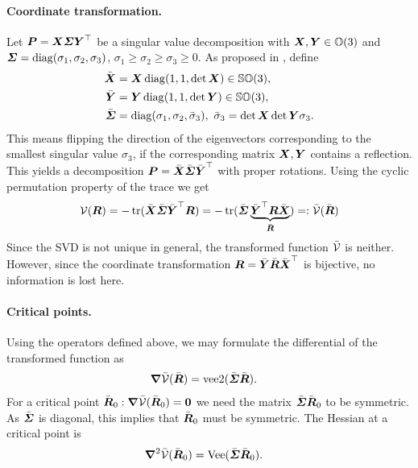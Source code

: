 \paragraph{Coordinate transformation.}
Let $\boldsymbol{P} = \boldsymbol{X} \boldsymbol{\varSigma} \boldsymbol{Y}^\top$ be a singular value decomposition with $\boldsymbol{X}, \boldsymbol{Y} \in \mathbb{O}(3)$ and $\boldsymbol{\varSigma} = \operatorname{diag}(\sigma_1, \sigma_2, \sigma_3)$, $\sigma_1 \geq \sigma_2 \geq \sigma_3 \geq 0$.
As proposed in \cite{Kabsch:SSVD}, define 
\begin{subequations}\label{eq:DefSSVD}
\begin{align}
 \bar{\boldsymbol{X}} &= \boldsymbol{X} \operatorname{diag}(1, 1, \det\boldsymbol{X}) \in \mathbb{SO}(3),
\\
 \bar{\boldsymbol{Y}} &= \boldsymbol{Y} \operatorname{diag}(1, 1, \det\boldsymbol{Y}) \in \mathbb{SO}(3),
\\
 \bar{\boldsymbol{\varSigma}} &= \operatorname{diag}(\sigma_1, \sigma_2, \bar{\sigma}_3), \ \bar{\sigma}_3 = \det\boldsymbol{X}\det\boldsymbol{Y} \sigma_3 .
\end{align} 
\end{subequations}
This means flipping the direction of the eigenvectors corresponding to the smallest singular value $\sigma_3$, if the corresponding matrix $\boldsymbol{X}, \boldsymbol{Y}$ contains a reflection.
This yields a decomposition $\boldsymbol{P} = \bar{\boldsymbol{X}} \bar{\boldsymbol{\varSigma}} \bar{\boldsymbol{Y}}^\top$ with proper rotations.
Using the cyclic permutation property of the trace we get
\begin{align}\label{eq:AttitudePotentialTrafo}
 \mathcal{V}(\boldsymbol{R}) = -\operatorname{tr}( \bar{\boldsymbol{X}} \bar{\boldsymbol{\varSigma}} \bar{\boldsymbol{Y}}^\top \boldsymbol{R}) = -\operatorname{tr}( \bar{\boldsymbol{\varSigma}} \underbrace{\bar{\boldsymbol{Y}}^\top \boldsymbol{R} \bar{\boldsymbol{X}}}_{\bar{\boldsymbol{R}}}) =: \bar{\mathcal{V}}(\bar{\boldsymbol{R}})
\end{align}
Since the SVD is not unique in general, the transformed function $\bar{\mathcal{V}}$ is neither.
However, since the coordinate transformation $\boldsymbol{R} = \bar{\boldsymbol{Y}} \bar{\boldsymbol{R}} \bar{\boldsymbol{X}}^\top$ is bijective, no information is lost here.

\paragraph{Critical points.}
Using the operators defined above, we may formulate the differential of the transformed function as
\begin{align}
 \boldsymbol{\nabla} \bar{\mathcal{V}}(\bar{\boldsymbol{R}}) &= \operatorname{vee2}(\bar{\boldsymbol{\varSigma}} \bar{\boldsymbol{R}}).
\end{align}
For a critical point $\bar{\boldsymbol{R}}_0 : \boldsymbol{\nabla} \bar{\mathcal{V}}(\bar{\boldsymbol{R}}_0)=\boldsymbol{0}$ we need the matrix $\bar{\boldsymbol{\varSigma}} \bar{\boldsymbol{R}}_0$ to be symmetric.
As $\bar{\boldsymbol{\varSigma}}$ is diagonal, this implies that $\bar{\boldsymbol{R}}_0$ must be symmetric.
The Hessian at a critical point is
\begin{align}
 \boldsymbol{\nabla}^2 \bar{\mathcal{V}}(\bar{\boldsymbol{R}}_0) &= \operatorname{Vee}(\bar{\boldsymbol{\varSigma}} \bar{\boldsymbol{R}}_0).
\end{align}

